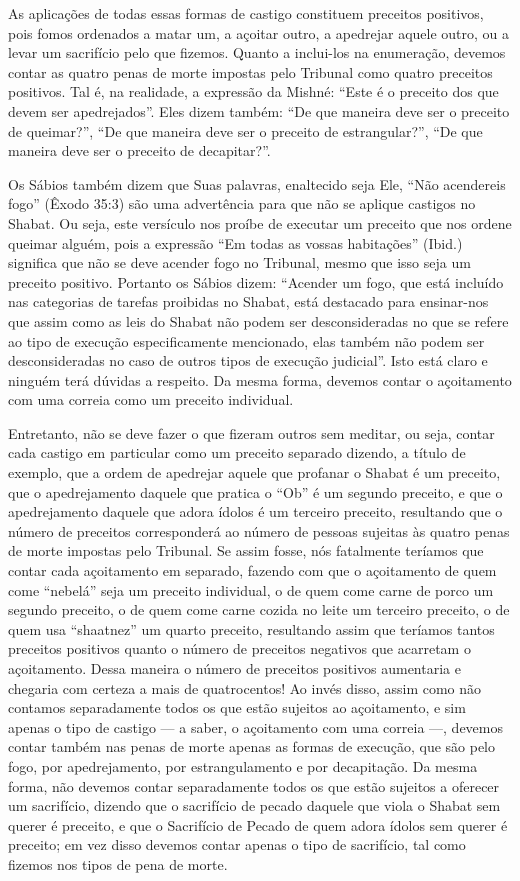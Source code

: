 As aplicações de todas essas formas de castigo constituem preceitos
positivos, pois fomos ordenados a matar um, a açoitar outro, a apedrejar
aquele outro, ou a levar um sacrifício pelo que fizemos. Quanto a
inclui-los na enumeração, devemos contar as quatro penas de morte
impostas pelo Tribunal como quatro preceitos positivos. Tal é, na
realidade, a expressão da Mishné: ``Este é o preceito dos que devem ser
apedrejados''. Eles dizem também: ``De que maneira deve ser o preceito
de queimar?'', ``De que maneira deve ser o preceito de estrangular?'',
``De que maneira deve ser o preceito de decapitar?''.

Os Sábios também dizem que Suas palavras, enaltecido seja Ele, ``Não
acendereis fogo'' (Êxodo 35:3) são uma advertência para que não se
aplique castigos no Shabat. Ou seja, este versículo nos proíbe de
executar um preceito que nos ordene queimar alguém, pois a expressão
``Em todas as vossas habitações'' (Ibid.) significa que não se deve
acender fogo no Tribunal, mesmo que isso seja um preceito positivo.
Portanto os Sábios dizem: ``Acender um fogo, que está incluído nas
categorias de tarefas proibidas no Shabat, está destacado para
ensinar-nos que assim como as leis do Shabat não podem ser
desconsideradas no que se refere ao tipo de execução especificamente
mencionado, elas também não podem ser desconsideradas no caso de outros
tipos de execução judicial''. Isto está claro e ninguém terá dúvidas a
respeito. Da mesma forma, devemos contar o açoitamento com uma correia
como um preceito individual.

Entretanto, não se deve fazer o que fizeram outros sem meditar, ou seja,
contar cada castigo em particular como um preceito separado dizendo, a
título de exemplo, que a ordem de apedrejar aquele que profanar o Shabat
é um preceito, que o apedrejamento daquele que pratica o ``Ob'' é um
segundo preceito, e que o apedrejamento daquele que adora ídolos é um
terceiro preceito, resultando que o número de preceitos corresponderá ao
número de pessoas sujeitas às quatro penas de morte impostas pelo
Tribunal. Se assim fosse, nós fatalmente teríamos que contar cada
açoitamento em separado, fazendo com que o açoitamento de quem come
``nebelá'' seja um preceito individual, o de quem come carne de porco um
segundo preceito, o de quem come carne cozida no leite um terceiro
preceito, o de quem usa ``shaatnez'' um quarto preceito, resultando
assim que teríamos tantos preceitos positivos quanto o número de
preceitos negativos que acarretam o açoitamento. Dessa maneira o número
de preceitos positivos aumentaria e chegaria com certeza a mais de
quatrocentos! Ao invés disso, assim como não contamos separadamente
todos os que estão sujeitos ao açoitamento, e sim apenas o tipo de
castigo --- a saber, o açoitamento com uma correia ---, devemos contar
também nas penas de morte apenas as formas de execução, que são pelo
fogo, por apedrejamento, por estrangulamento e por decapitação. Da
mesma forma, não devemos contar separadamente todos os que estão
sujeitos a oferecer um sacrifício, dizendo que o sacrifício de pecado
daquele que viola o Shabat sem querer é preceito, e que o Sacrifício de
Pecado de quem adora ídolos sem querer é preceito; em vez disso devemos
contar apenas o tipo de sacrifício, tal como fizemos nos tipos de pena
de morte.

